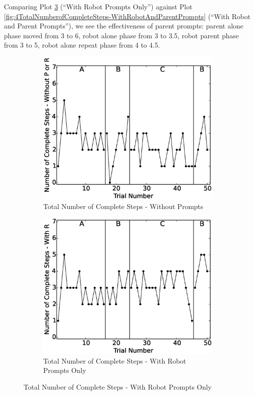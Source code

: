 Comparing Plot \ref{fig:6TotalNumberofCompleteSteps-WithRobotPrompts} (``With Robot Prompts Only'') against Plot \ref{fig:4TotalNumberofCompleteSteps-WithRobotAndParentPrompts} (``With Robot and Parent Prompts''), we see the effectiveness of parent prompts: parent alone phase moved from 3 to 6, robot alone phase from 3 to 3.5, robot parent phase from 3 to 5, robot alone repeat phase from 4 to 4.5.
\begin{figure}[h]
	\centering
	\begin{subfigure}[b]{0.49\textwidth}
		\includegraphics[width=1.1\linewidth]{./img/data_analysis/110NumberofCompleteSteps-WithoutPorR.eps}
		\caption{Total Number of Complete Steps - Without Prompts}
		\label{fig:7TotalNumberofCompleteSteps-WithoutPrompts}
	\end{subfigure}
	\hfill
	\begin{subfigure}[b]{0.49\textwidth}
		\includegraphics[width=1.1\linewidth]{./img/data_analysis/109NumberofCompleteSteps-WithR.eps}
		\caption{Total Number of Complete Steps - With Robot Prompts Only}
		\label{fig:6TotalNumberofCompleteSteps-WithRobotPrompts}
	\end{subfigure}%
	

\end{figure}

